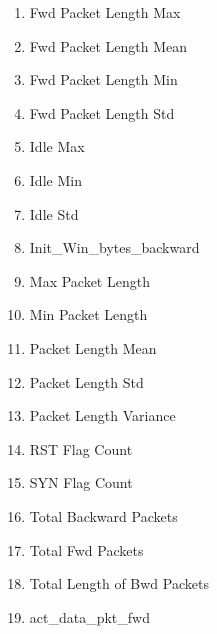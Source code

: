 \begin{multicols}{2}
\begin{enumerate}
  \item Fwd Packet Length Max
  \item Fwd Packet Length Mean
  \item Fwd Packet Length Min
  \item Fwd Packet Length Std
  \item Idle Max
  \item Idle Min
  \item Idle Std
  \item Init\_Win\_bytes\_backward
  \item Max Packet Length
  \item Min Packet Length
  \item Packet Length Mean
  \item Packet Length Std
  \item Packet Length Variance
  \item RST Flag Count
  \item SYN Flag Count
  \item Total Backward Packets
  \item Total Fwd Packets
  \item Total Length of Bwd Packets
  \item act\_data\_pkt\_fwd
\end{enumerate}
\end{multicols}